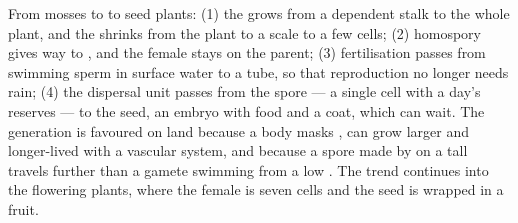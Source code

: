 \begin{proposition}\label{prop:b2:plant-life-cycles:trends}
From mosses to  to seed plants: (1) the  grows from a
dependent stalk to the whole plant, and the  shrinks from
the plant to a scale to a few cells; (2) homospory gives way to
, and the female  stays on the parent;
(3) fertilisation passes from swimming sperm in surface water to a
 tube, so that reproduction no longer needs rain; (4) the
dispersal unit passes from the spore --- a single cell with a day's
reserves --- to the seed, an embryo with food and a coat, which can
wait. The  generation is favoured on land because a 
body masks  , can grow larger and longer-lived
with a vascular system, and because a spore made by  on a tall
 travels further than a gamete swimming from a low
. The trend continues into the flowering plants, where
the female  is seven cells and the seed is wrapped in a
fruit.
\end{proposition}

